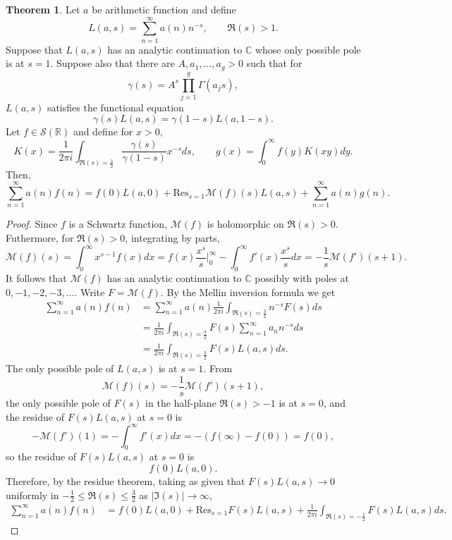 \documentclass{article}
\newcommand{\Res}{\mathrm{Res}}
\theoremstyle{definition}
\newtheorem{theorem}{Theorem}
\begin{document}
\begin{theorem}
Let $a$ be arithmetic function and define
\[
L(a,s) = \sum_{n=1}^\infty a(n) n^{-s}, \qquad \Re(s)>1.
\]
Suppose that $L(a,s)$ has an analytic continuation to $\mathbb{C}$ whose only possible pole
is at $s=1$. 
Suppose also that there are $A,a_1,\ldots,a_g>0$ such that
for
\[
\gamma(s) = A^s \prod_{j=1}^g \Gamma(a_j s),
\]
$L(a,s)$
satisfies the functional equation
\[
\gamma(s)L(a,s) = \gamma(1-s)L(a,1-s).
\]
Let  $f \in \mathscr{S}(\mathbb{R})$ and define for $x>0$,
\[
K(x) = \frac{1}{2\pi i} \int_{\Re(s)=\frac{3}{2}} \frac{\gamma(s)}{\gamma(1-s)} x^{-s} ds,
\qquad g(x) = \int_0^\infty f(y) K(xy) dy.
\]
Then,
\[
\sum_{n=1}^\infty a(n) f(n) = f(0)L(a,0) + \Res_{s=1} \mathscr{M}(f)(s) L(a,s)
+  \sum_{n=1}^\infty a(n) g(n).
\]
\label{generalized}
\end{theorem}
\begin{proof}
Since $f$ is a Schwartz function, $\mathscr{M}(f)$ is holomorphic on $\Re(s)>0$. 
Futhermore, for $\Re(s)>0$, integrating by parts,
\[
\mathscr{M}(f)(s)=\int_0^\infty x^{s-1} f(x) dx
=f(x) \frac{x^s}{s} \bigg|_0^\infty - 
\int_0^\infty f'(x) \frac{x^s}{s} dx
=-\frac{1}{s}\mathscr{M}(f')(s+1).
\]
It follows that $\mathscr{M}(f)$ has an analytic continuation to $\mathbb{C}$ possibly with poles
at $0,-1,-2,-3,\ldots$.
Write $F=\mathscr{M}(f)$. By the Mellin inversion formula we get
\begin{align*}
\sum_{n=1}^\infty a(n) f(n)&=\sum_{n=1}^\infty a(n) 
\frac{1}{2\pi i}\int_{\Re(s)=\frac{3}{2}} n^{-s} F(s) ds\\
&=\frac{1}{2\pi i} \int_{\Re(s)=\frac{3}{2}} F(s) \sum_{n=1}^\infty a_n n^{-s} ds\\
&=\frac{1}{2\pi i} \int_{\Re(s)=\frac{3}{2}}F(s) L(a,s) ds.
\end{align*}
The only possible pole of $L(a,s)$ is at $s=1$. From 
\[
\mathscr{M}(f)(s)=-\frac{1}{s}\mathscr{M}(f')(s+1),
\]
the only possible pole of $F(s)$ in the half-plane $\Re(s)>-1$ is at $s=0$,
and the residue of $F(s)L(a,s)$ at $s=0$ is
\[
-\mathscr{M}(f')(1)=-\int_0^\infty f'(x) dx = -(f(\infty)-f(0)) = f(0),
\]
so the residue of $F(s)L(a,s)$ at $s=0$ is
\[
f(0)L(a,0).
\]
Therefore, by the residue theorem, taking as given  that $F(s)L(a,s) \to 0$ uniformly in $-\frac{1}{2} \leq \Re(s) \leq \frac{3}{2}$ as $|\Im(s)| \to \infty$,
\begin{align*}
\sum_{n=1}^\infty a(n) f(n)&=f(0)L(a,0)+\Res_{s=1} F(s)L(a,s)
+ \frac{1}{2\pi i} \int_{\Re(s)=-\frac{1}{2}} F(s)L(a,s) ds.
\end{align*}



\end{proof}
\end{document}
